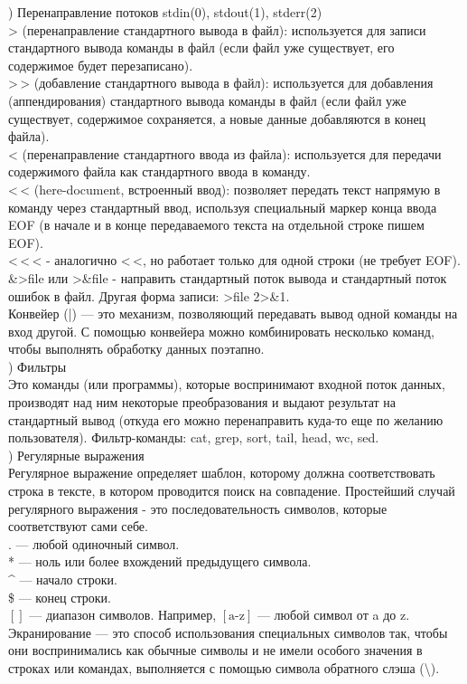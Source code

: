 ) Перенаправление потоков stdin(0), stdout(1), stderr(2) \\
> (перенаправление стандартного вывода в файл): используется для записи стандартного вывода команды в файл (если файл уже существует, его содержимое будет перезаписано). \\
>\,> (добавление стандартного вывода в файл):
используется для добавления (аппендирования) стандартного вывода команды в файл (если файл уже существует, содержимое сохраняется, а новые данные добавляются в конец файла). \\
< (перенаправление стандартного ввода из файла): используется для передачи содержимого файла как стандартного ввода в команду. \\
<\,< (here-document, встроенный ввод): позволяет передать текст напрямую в команду через стандартный ввод, используя специальный маркер конца ввода EOF (в начале и в конце передаваемого текста на отдельной строке пишем EOF). \\
<\,<\,< - аналогично <\,<, но работает только для одной строки (не требует EOF). \\ 
\&>file или >\&file - направить стандартный поток вывода и стандартный поток ошибок в файл. Другая форма записи: >file 2>\&1. \\
Конвейер (|) — это механизм, позволяющий передавать вывод одной команды на вход другой. С помощью конвейера
можно комбинировать несколько команд, чтобы выполнять обработку данных поэтапно. \\

) Фильтры \\
Это команды (или программы), которые воспринимают входной поток данных, производят над ним некоторые преобразования и выдают результат на стандартный вывод (откуда его можно перенаправить куда-то еще по желанию пользователя). Фильтр-команды: cat, grep, sort, tail, head, wc, sed. \\

) Регулярные выражения \\
Регулярное выражение определяет шаблон, которому должна соответствовать строка в тексте, в котором проводится поиск на совпадение. Простейший случай регулярного выражения - это последовательность символов, которые соответствуют сами себе. \\
. — любой одиночный символ. \\
* — ноль или более вхождений предыдущего символа. \\
\^{} — начало строки. \\
\$ — конец строки. \\
$[]$ — диапазон символов. Например, $[\text{a-z}]$ — любой символ от a до z. \\
Экранирование — это способ использования специальных символов так, чтобы они воспринимались как обычные символы и не имели особого значения в строках или командах, выполняется с помощью символа обратного слэша (\textbackslash). \\

